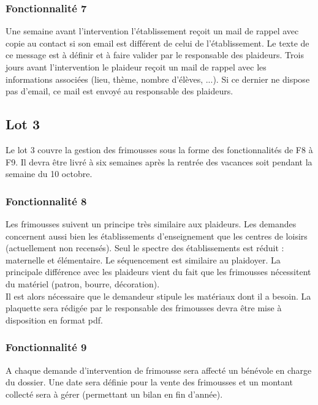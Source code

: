 \subsubsection{Fonctionnalité 7}
Une semaine avant l'intervention l'établissement reçoit un mail de rappel avec
copie au contact si son email est différent de celui de l'établissement. Le texte de ce message est à définir et à faire valider par le responsable des plaideurs. Trois jours avant l'intervention le plaideur reçoit un mail de rappel avec les informations associées (lieu, thème, nombre d'élèves, ...). Si ce dernier ne dispose pas d'email, ce mail est envoyé au responsable des plaideurs. 
\\

\subsection{Lot 3}

Le lot 3 couvre la gestion des frimousses sous la forme des fonctionnalités de F8 à F9. Il devra être livré à six semaines après la rentrée des vacances soit pendant la semaine du 10 octobre.
\\

\subsubsection{Fonctionnalité 8}
Les frimousses suivent un principe très similaire aux plaideurs. Les demandes concernent aussi bien les établissements d'enseignement que les centres de loisirs (actuellement non recensés). Seul le spectre des établissements est réduit : maternelle et élémentaire. Le séquencement est similaire au plaidoyer.
La principale différence avec les plaideurs vient du fait que les frimousses nécessitent du matériel (patron, bourre, décoration). \\
 Il est alors nécessaire que le demandeur stipule les matériaux dont il a
besoin.
La plaquette sera rédigée par le responsable des frimousses devra être mise à disposition en format pdf. 
\\

\subsubsection{Fonctionnalité 9}
A chaque demande d'intervention de frimousse sera affecté un bénévole en charge du dossier. Une date sera définie pour la vente des frimousses et un montant collecté sera à gérer (permettant un bilan en fin d'année).
\\

